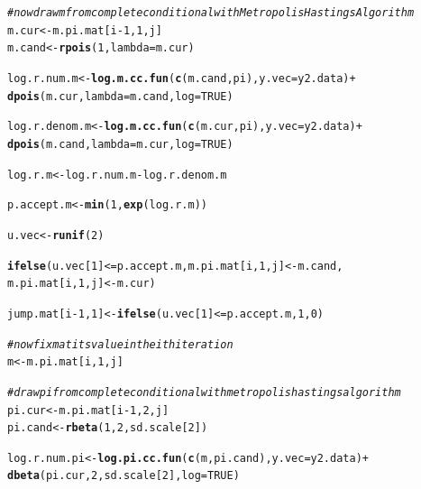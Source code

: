 \documentclass[12pt]{article}\usepackage[]{graphicx}\usepackage[]{color}
\makeatletter
\newcommand{\hlnum}[1]{\textcolor[rgb]{0.686,0.059,0.569}{#1}}%
\newcommand{\hlcom}[1]{\textcolor[rgb]{0.678,0.584,0.686}{\textit{#1}}}%
\newcommand{\hlopt}[1]{\textcolor[rgb]{0,0,0}{#1}}%
\newcommand{\hlstd}[1]{\textcolor[rgb]{0.345,0.345,0.345}{#1}}%
\newcommand{\hlkwb}[1]{\textcolor[rgb]{0.69,0.353,0.396}{#1}}%
\newcommand{\hlkwc}[1]{\textcolor[rgb]{0.333,0.667,0.333}{#1}}%
\newcommand{\hlkwd}[1]{\textcolor[rgb]{0.737,0.353,0.396}{\textbf{#1}}}%
\newenvironment{kframe}{%
 \def\at@end@of@kframe{}%
 \ifinner\ifhmode%
  \def\at@end@of@kframe{\end{minipage}}%
  \begin{minipage}{\columnwidth}%
 \fi\fi%
 \def\FrameCommand##1{\hskip\@totalleftmargin \hskip-\fboxsep
 \colorbox{shadecolor}{##1}\hskip-\fboxsep
     \hskip-\linewidth \hskip-\@totalleftmargin \hskip\columnwidth}%
 \MakeFramed {\advance\hsize-\width
   \@totalleftmargin\z@ \linewidth\hsize
   \@setminipage}}%
 {\par\unskip\endMakeFramed%
 \at@end@of@kframe}
\newenvironment{knitrout}{}{} %
\makeatother
\begin{document}
\begin{enumerate}
\begin{enumerate}
\begin{enumerate}
\begin{knitrout}
\begin{kframe}
\begin{alltt}
    \hlcom{#now draw m from complete conditional with Metropolis Hastings Algorithm}
    \hlstd{m.cur} \hlkwb{<-} \hlstd{m.pi.mat[i}\hlopt{-}\hlnum{1}\hlstd{,} \hlnum{1}\hlstd{, j]}
    \hlstd{m.cand} \hlkwb{<-} \hlkwd{rpois}\hlstd{(}\hlnum{1}\hlstd{,} \hlkwc{lambda}\hlstd{=m.cur)}

    \hlstd{log.r.num.m} \hlkwb{<-} \hlkwd{log.m.cc.fun}\hlstd{(}\hlkwd{c}\hlstd{(m.cand, pi),} \hlkwc{y.vec} \hlstd{= y2.data)} \hlopt{+}
                     \hlkwd{dpois}\hlstd{(m.cur,} \hlkwc{lambda}\hlstd{=m.cand,} \hlkwc{log} \hlstd{=} \hlnum{TRUE}\hlstd{)}

    \hlstd{log.r.denom.m} \hlkwb{<-} \hlkwd{log.m.cc.fun}\hlstd{(}\hlkwd{c}\hlstd{(m.cur, pi),} \hlkwc{y.vec} \hlstd{= y2.data)} \hlopt{+}
                       \hlkwd{dpois}\hlstd{(m.cand,} \hlkwc{lambda}\hlstd{=m.cur,} \hlkwc{log} \hlstd{=} \hlnum{TRUE}\hlstd{)}

    \hlstd{log.r.m} \hlkwb{<-} \hlstd{log.r.num.m} \hlopt{-} \hlstd{log.r.denom.m}

    \hlstd{p.accept.m} \hlkwb{<-} \hlkwd{min}\hlstd{(}\hlnum{1}\hlstd{,} \hlkwd{exp}\hlstd{(log.r.m))}

    \hlstd{u.vec} \hlkwb{<-} \hlkwd{runif}\hlstd{(}\hlnum{2}\hlstd{)}

    \hlkwd{ifelse}\hlstd{(u.vec[}\hlnum{1}\hlstd{]} \hlopt{<=} \hlstd{p.accept.m, m.pi.mat[i,} \hlnum{1}\hlstd{, j]} \hlkwb{<-} \hlstd{m.cand,}
           \hlstd{m.pi.mat[i,} \hlnum{1}\hlstd{, j]} \hlkwb{<-} \hlstd{m.cur)}

    \hlstd{jump.mat[i}\hlopt{-}\hlnum{1}\hlstd{,} \hlnum{1}\hlstd{]} \hlkwb{<-} \hlkwd{ifelse}\hlstd{(u.vec[}\hlnum{1}\hlstd{]} \hlopt{<=} \hlstd{p.accept.m,} \hlnum{1}\hlstd{,} \hlnum{0}\hlstd{)}

    \hlcom{#now fix m at its value in the ith iteration}
    \hlstd{m} \hlkwb{<-} \hlstd{m.pi.mat[i,} \hlnum{1}\hlstd{, j]}

    \hlcom{#draw pi from complete conditional with metropolis hastings algorithm}
    \hlstd{pi.cur} \hlkwb{<-} \hlstd{m.pi.mat[i}\hlopt{-}\hlnum{1}\hlstd{,} \hlnum{2}\hlstd{, j]}
    \hlstd{pi.cand} \hlkwb{<-} \hlkwd{rbeta}\hlstd{(}\hlnum{1}\hlstd{,} \hlnum{2}\hlstd{, sd.scale[}\hlnum{2}\hlstd{])}

    \hlstd{log.r.num.pi} \hlkwb{<-} \hlkwd{log.pi.cc.fun}\hlstd{(}\hlkwd{c}\hlstd{(m, pi.cand),} \hlkwc{y.vec} \hlstd{= y2.data)} \hlopt{+}
                     \hlkwd{dbeta}\hlstd{(pi.cur,} \hlnum{2}\hlstd{, sd.scale[}\hlnum{2}\hlstd{],} \hlkwc{log} \hlstd{=} \hlnum{TRUE}\hlstd{)}


\end{alltt}
\end{kframe}
\end{knitrout}
\end{enumerate}
\end{enumerate}
\end{enumerate}
\end{document}

